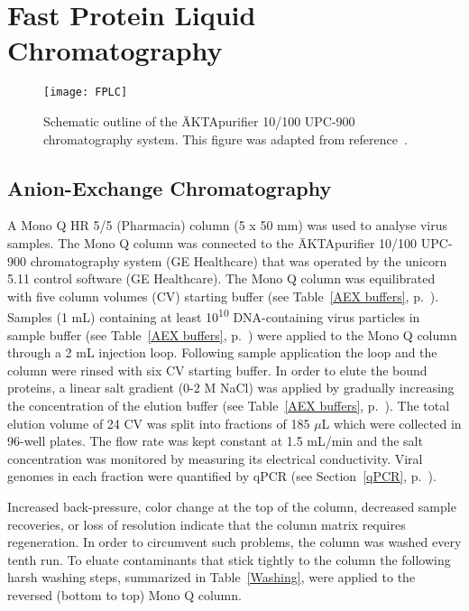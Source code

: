 \section{Fast Protein Liquid Chromatography}
\label{ÄKTA}

\begin{figure}[H]
\centering
  \texttt{[image: FPLC]}\\[0.2 cm]
  \caption[Schematic Outline of the ÄKTA Chromatography System]
   {Schematic outline of the ÄKTApurifier 10/100 UPC-900 chromatography system. This figure was adapted from reference~\cite{pmid20978981}.} 
\label{FPLC}
\end{figure}


\subsection{Anion-Exchange Chromatography}
\label{AEX}
A Mono Q\textsuperscript{\texttrademark} HR 5/5 (Pharmacia) column (5 x 50 mm) was used to analyse virus samples. The Mono Q column was connected to the ÄKTApurifier 10/100 UPC-900 chromatography system (GE Healthcare) that was operated by the unicorn 5.11 control software (GE Healthcare). The Mono Q\textsuperscript{\texttrademark} column was equilibrated with five column volumes (CV) starting buffer (see Table~\ref{AEX buffers}, p.~\pageref{AEX buffers}). Samples (1 mL) containing at least 10\textsuperscript{10} DNA-containing virus particles in sample buffer (see Table~\ref{AEX buffers}, p.~\pageref{AEX buffers}) were applied to the Mono Q\textsuperscript{\texttrademark} column through a 2 mL injection loop. Following sample application the loop and the column were rinsed with six CV starting buffer. In order to elute the bound proteins, a linear salt gradient (0-2 M NaCl) was applied by gradually increasing the concentration of the elution buffer (see Table~\ref{AEX buffers}, p.~\pageref{AEX buffers}). The total elution volume of 24 CV was split into fractions of 185 $\mu$L which were collected in 96-well plates. The flow rate was kept constant at 1.5 mL/min and the salt concentration was monitored by measuring its electrical conductivity. Viral genomes in each fraction were quantified by qPCR (see Section~\ref{qPCR}, p.~\pageref{qPCR}).  

Increased back-pressure, color change at the top of the column, decreased sample recoveries, or loss of resolution indicate that the column matrix requires regeneration. In order to circumvent such problems, the column was washed every tenth run. To eluate contaminants that stick tightly to the column the following harsh washing steps, summarized in Table~\ref{Washing}, were applied to the reversed (bottom to top) Mono Q\textsuperscript{\texttrademark} column. 

